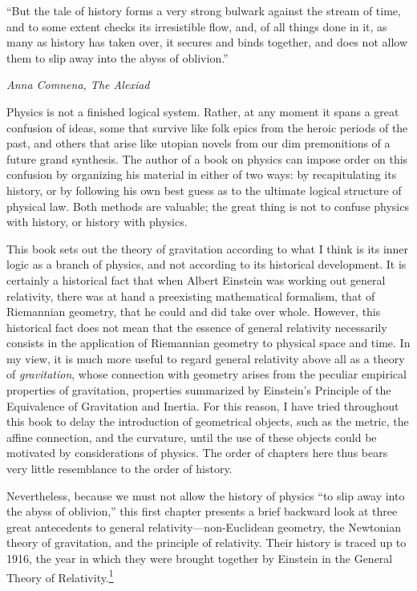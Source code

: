 
\begin{flushright}
\begin{minipage}{0.43\textwidth}
\small
``But the tale of history forms a very strong bulwark against the stream of
time, and to some extent checks its irresistible flow, and, of all things done
in it, as many as history has taken over, it secures and binds together, and
does not allow them to slip away into the abyss of oblivion.''

\medskip
\emph{Anna Comnena, The Alexiad}
\end{minipage}
\end{flushright}

Physics is not a finished logical system. Rather, at any moment it spans a
great confusion of ideas, some that survive like folk epics from the heroic
periods of the past, and others that arise like utopian novels from our dim
premonitions of a future grand synthesis. The author of a book on physics can
impose order on this confusion by organizing his material in either of two
ways: by recapitulating its history, or by following his own best guess as to
the ultimate logical structure of physical law. Both methods are valuable; the
great thing is not to confuse physics with history, or history with physics.

This book sets out the theory of gravitation according to what I think is its
inner logic as a branch of physics, and not according to its historical
development. It is certainly a historical fact that when Albert Einstein was
working out general relativity, there was at hand a preexisting mathematical
formalism, that of Riemannian geometry, that he could and did take over whole.
However, this historical fact does not mean that the essence of general
relativity necessarily consists in the application of Riemannian geometry to
physical space and time. In my view, it is much more useful to regard general
relativity above all as a theory of \emph{gravitation}, whose connection with
geometry arises from the peculiar empirical properties of gravitation,
properties summarized by Einstein's Principle of the Equivalence of
Gravitation and Inertia. For this reason, I have tried throughout this book to
delay the introduction of geometrical objects, such as the metric, the affine
connection, and the curvature, until the use of these objects could be
motivated by considerations of physics. The order of chapters here thus bears
very little resemblance to the order of history.

Nevertheless, because we must not allow the history of physics ``to slip away
into the abyss of oblivion,'' this first chapter presents a brief backward look
at three great antecedents to general relativity---non-Euclidean geometry, the
Newtonian theory of gravitation, and the principle of relativity. Their history
is traced up to 1916, the year in which they were brought together by Einstein
in the General Theory of
Relativity.\hyperref[ch1-ref-1]{\textsuperscript{1}}
